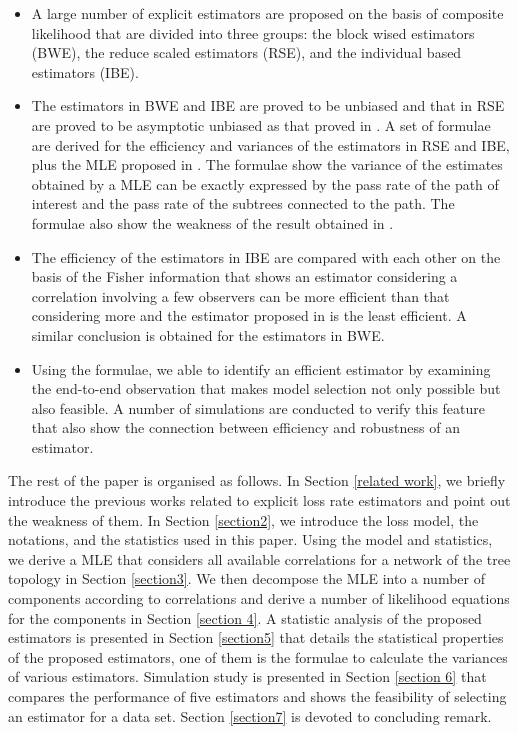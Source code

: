 \documentclass[10pt,onecolumn]{IEEEtran}
\begin{document}
\begin{itemize}
\item A large number of explicit estimators are proposed on the basis of composite likelihood \cite{Lindsay88} that are divided into three groups: the block wised estimators (BWE), the reduce scaled  estimators (RSE), and the individual based estimators (IBE).
\item The estimators in BWE and IBE are proved to be unbiased and that in RSE are proved to be  asymptotic unbiased as that proved in   \cite{DHPT06}. A set of formulae are derived for the efficiency and variances of the estimators in RSE and IBE, plus the MLE proposed in \cite{CDHT99}. The formulae show the variance of the estimates obtained by a MLE can be exactly expressed by the pass rate of the path of interest and the pass rate of the subtrees connected to the path.  The formulae also show the weakness of the result obtained in \cite{DHPT06}.
\item  The efficiency of the estimators in IBE are compared with each other on the basis of the Fisher information that  shows an estimator considering  a correlation involving a few observers can be more efficient than that considering more and the estimator proposed in \cite{DHPT06} is the least efficient. A similar conclusion is obtained for the estimators in BWE.
\item  Using the formulae, we able to identify an efficient estimator by examining the end-to-end observation that makes model selection not only possible but also feasible. A number of simulations are conducted to verify this feature that also show the connection between efficiency  and robustness of an estimator.
    \end{itemize}

The rest of the paper is organised as follows. In Section \ref{related work},  we briefly introduce the previous works related to explicit loss rate estimators and point out the weakness of them. In Section \ref{section2}, we introduce the loss model, the notations, and the statistics used in this paper.  Using the model and statistics, we  derive a MLE that considers all available correlations for a network of the tree topology in Section \ref{section3}. We then decompose the MLE into a number of components according to correlations and derive a number of likelihood equations for the components in Section \ref{section 4}. A statistic analysis of the proposed estimators is presented in Section \ref{section5} that details the statistical properties of the proposed estimators, one of them is the formulae to calculate the variances of various estimators. Simulation study is presented in Section \ref{section 6} that compares the performance of five estimators and shows the feasibility of selecting an estimator for a data set.
Section \ref{section7} is devoted to concluding remark.
\end{document}
